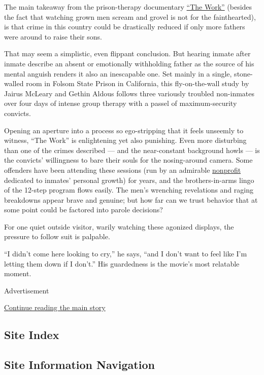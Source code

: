 The main takeaway from the prison-therapy documentary
\href{https://www.nytimes.com/video/movies/100000005492201/trailer-the-work.html}{``The
Work''} (besides the fact that watching grown men scream and grovel is
not for the fainthearted), is that crime in this country could be
drastically reduced if only more fathers were around to raise their
sons.

That may seem a simplistic, even flippant conclusion. But hearing inmate
after inmate describe an absent or emotionally withholding father as the
source of his mental anguish renders it also an inescapable one. Set
mainly in a single, stone-walled room in Folsom State Prison in
California, this fly-on-the-wall study by Jairus McLeary and Gethin
Aldous follows three variously troubled non-inmates over four days of
intense group therapy with a passel of maximum-security convicts.

Opening an aperture into a process so ego-stripping that it feels
unseemly to witness, ``The Work'' is enlightening yet also punishing.
Even more disturbing than one of the crimes described --- and the
near-constant background howls --- is the convicts' willingness to bare
their souls for the nosing-around camera. Some offenders have been
attending these sessions (run by an admirable
\href{http://insidecircle.org/about-us/our-mission/}{nonprofit}
dedicated to inmates' personal growth) for years, and the
brothers-in-arms lingo of the 12-step program flows easily. The men's
wrenching revelations and raging breakdowns appear brave and genuine;
but how far can we trust behavior that at some point could be factored
into parole decisions?

For one quiet outside visitor, warily watching these agonized displays,
the pressure to follow suit is palpable.

``I didn't come here looking to cry,'' he says, ``and I don't want to
feel like I'm letting them down if I don't.'' His guardedness is the
movie's most relatable moment.

Advertisement

\protect\hyperlink{after-bottom}{Continue reading the main story}

\hypertarget{site-index}{%
\subsection{Site Index}\label{site-index}}

\hypertarget{site-information-navigation}{%
\subsection{Site Information
Navigation}\label{site-information-navigation}}

